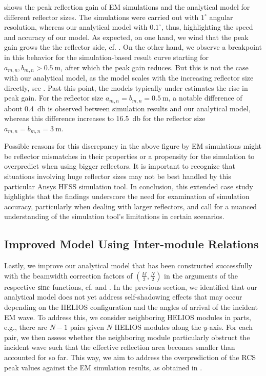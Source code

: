  shows the peak reflection gain of EM simulations and the analytical model for different reflector sizes. The simulations were carried out with $1^\circ$ angular resolution, whereas our analytical model with $0.1^\circ$, thus, highlighting the speed and accuracy of our model. As expected, on one hand, we wind that the peak gain grows the the reflector side, cf. . On the other hand, we observe a breakpoint in this behavior for the simulation-based result curve starting for $a_{m,n}, b_{m,n} > \SI{0.5}{\meter}$, after which the peak gain reduces. But this is not the case with our analytical model, as the model scales with the increasing reflector size directly, see . Past this point, the models typically under estimates the rise in peak gain. For the reflector size $a_{m,n}=b_{m,n}=\SI{0.5}{\meter}$, a notable difference of about \SI{0.4}{\decibel} is observed between simulation results and our analytical model, whereas this difference increases to \SI{16.5}{\decibel} for the reflector size $a_{m,n}=b_{m,n}=\SI{3}{\meter}$.

Possible reasons for this discrepancy in the above figure by EM simulations might be reflector mismatches in their properties or a propensity for the simulation to overpredict when using bigger reflectors. It is important to recognize that situations involving huge reflector sizes may not be best handled by this particular Ansys HFSS simulation tool. In conclusion, this extended case study highlights that the findings underscore the need for examination of simulation accuracy, particularly when dealing with larger reflectors, and call for a nuanced understanding of the simulation tool's limitations in certain scenarios.
\subsection{Improved Model Using Inter-module Relations} \label{Improved Model using Inter-module Relations}
Lastly, we improve our analytical model that has been constructed successfully with the beamwidth correction factors of $(\frac{M}{2},\frac{N}{2})$ in the arguments of the respective $\operatorname{sinc}$ functions, cf.  and . In the previous section, we identified that our analytical model does not yet address self-shadowing effects that may occur depending on the HELIOS configuration and the angles of arrival of the incident EM wave. To address this, we consider neighboring HELIOS modules in parts, e.g., there are $N-1$ pairs given $N$ HELIOS modules along the $y$-axis. For each pair, we then assess whether the neighboring module particularly obstruct the incident wave such that the effective reflection area becomes smaller than accounted for so far. This way, we aim to address the overprediction of the RCS peak values against the EM simulation results, as obtained in .


